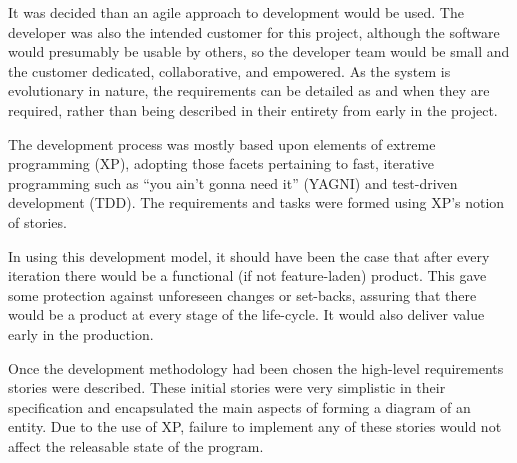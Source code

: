 It was decided than an agile approach to development would be used. The developer was also the intended customer for this project, although the software would presumably be usable by others, so the developer team would be small and the customer dedicated, collaborative, and empowered. As the system is evolutionary in nature, the requirements can be detailed as and when they are required, rather than being described in their entirety from early in the project.

The development process was mostly based upon elements of extreme programming (XP), adopting those facets pertaining to fast, iterative programming such as ``you ain't gonna need it'' (YAGNI) and test-driven development (TDD). The requirements and tasks were formed using XP's notion of stories.

In using this development model, it should have been the case that after every iteration there would be a functional (if not feature-laden) product. This gave some protection against unforeseen changes or set-backs, assuring that there would be a product at every stage of the life-cycle. It would also deliver value early in the production.

Once the development methodology had been chosen the high-level requirements stories were described. These initial stories were very simplistic in their specification and encapsulated the main aspects of forming a diagram of an entity. Due to the use of XP, failure to implement any of these stories would not affect the releasable state of the program.